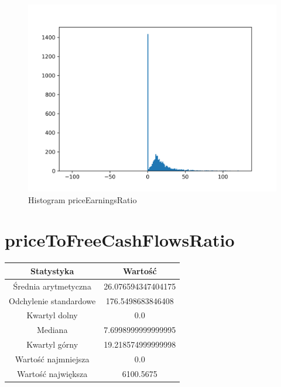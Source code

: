 \documentclass{article}
\begin{document}
\begin{figure}[h!]
    \includegraphics[width=\linewidth]{variables/priceEarningsRatio.png}
    \caption{Histogram priceEarningsRatio }
\end{figure}\section{ priceToFreeCashFlowsRatio }

\begin{center}
    \begin{tabular}{|c | c|} 
    \hline
    Statystyka & Wartość \\
    \hline\hline
    Średnia arytmetyczna & 26.076594347404175 \\ 
    \hline
    Odchylenie standardowe & 176.5498683846408 \\
    \hline
    Kwartyl dolny & 0.0 \\
    \hline
    Mediana & 7.6998999999999995 \\
    \hline
    Kwartyl górny & 19.218574999999998 \\
    \hline
    Wartość najmniejsza & 0.0 \\
    \hline
    Wartość największa & 6100.5675 \\
    \hline
   \end{tabular}
\end{center}
\end{document}
